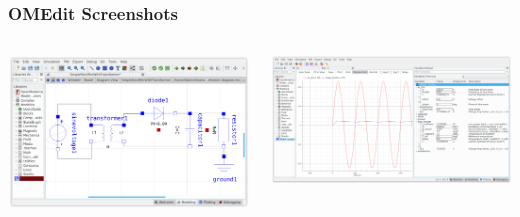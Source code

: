 \begin{frame}
  \frametitle{OMEdit Screenshots}
  \begin{columns}
    \begin{column}[c]{.5\textwidth}
      \begin{center}
        \includegraphics[width=1.\textwidth]{images/omedit-schema.png}
      \end{center}
    \end{column}
    \begin{column}[c]{.5\textwidth}
      \begin{center}
        \includegraphics[width=1.\textwidth]{images/omedit-plot.png}
      \end{center}
    \end{column}
  \end{columns}
\end{frame}

